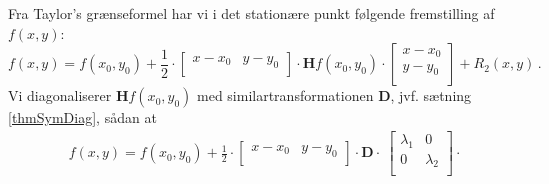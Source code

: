 \begin{bevis}
Fra Taylor's grænseformel har vi i det stationære punkt følgende fremstilling af $f(x,y)$:
\begin{equation}
f(x,y) = f(x_{0}, y_{0}) + \frac{1}{2}\cdot \left[
                                          \begin{array}{cc}
                                            x-x_{0} & y-y_{0} \\
                                          \end{array}
                                        \right] \cdot \mathbf{H}f(x_{0}, y_{0})\cdot \left[
                                                                                   \begin{array}{c}
                                                                                         x-x_{0}  \\
                                                                                         y-y_{0}  \\
                                                                                   \end{array}                                                                                \right] + R_{2}(x,y) \,.
\end{equation}
Vi diagonaliserer $\bm{H}f(x_{0}, y_{0})$ med similartransformationen $\mathbf{D}$, jvf. sætning \ref{thmSymDiag}, sådan at
\begin{equation}
\begin{aligned}
&f(x,y) = f(x_{0}, y_{0}) + \frac{1}{2}\cdot \left[
                                          \begin{array}{cc}
                                            x-x_{0} & y-y_{0} \\
                                          \end{array}
                                        \right] \cdot \mathbf{D}\cdot\ \left[
                                                                               \begin{array}{cc}
                                                                                 \lambda_{1} & 0 \\
                                                                                 0 & \lambda_{2} \\
                                                                               \end{array}
                                                                             \right] \cdot

\end{aligned}
\end{equation}
\end{bevis}

